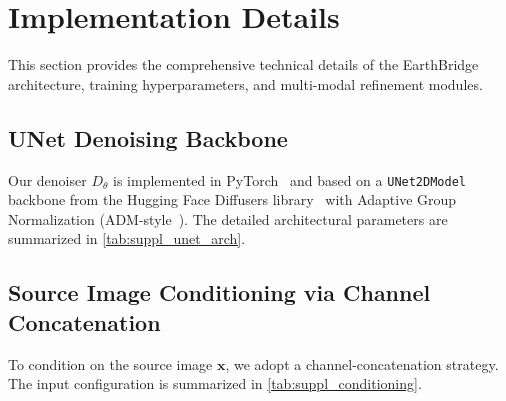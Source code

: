 \section{Implementation Details}
\label{sec:suppl_impl}

This section provides the comprehensive technical details of the EarthBridge architecture, training hyperparameters, and multi-modal refinement modules.

\subsection{UNet Denoising Backbone}
\label{sec:suppl_architecture}
Our denoiser $D_\theta$ is implemented in PyTorch~\cite{paszkePyTorchImperativeStyle2019} and based on a \texttt{UNet2DModel} backbone from the Hugging Face Diffusers library~\cite{vonplatenDiffusersStateoftheartDiffusion2022} with Adaptive Group Normalization (ADM-style~\cite{dhariwalDiffusionModelsBeat2021}). The detailed architectural parameters are summarized in \cref{tab:suppl_unet_arch}.

\begin{table}[h]
\centering
\caption{{\color{gray}UNet denoising backbone architectural parameters.}}
\label{tab:suppl_unet_arch}
{\color{gray}
%
}
\end{table}

\subsection{Source Image Conditioning via Channel Concatenation}
To condition on the source image $\bm{x}$, we adopt a channel-concatenation strategy. The input configuration is summarized in \cref{tab:suppl_conditioning}.

